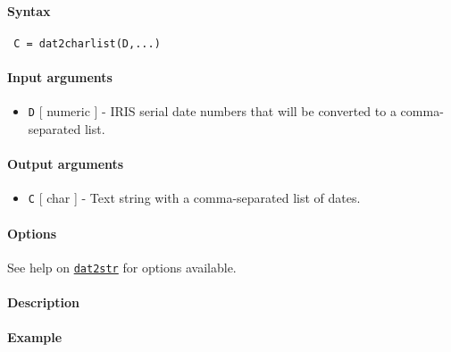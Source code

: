 


	\paragraph{Syntax}
 
 \begin{verbatim}
 C = dat2charlist(D,...)
 \end{verbatim}
 
 \paragraph{Input arguments}
 
 \begin{itemize}
 \item
   \texttt{D} {[} numeric {]} - IRIS serial date numbers that will be
   converted to a comma-separated list.
 \end{itemize}
 
 \paragraph{Output arguments}
 
 \begin{itemize}
 \item
   \texttt{C} {[} char {]} - Text string with a comma-separated list of
   dates.
 \end{itemize}
 
 \paragraph{Options}
 
 See help on \href{dates/dat2str}{\texttt{dat2str}} for options
 available.
 
 \paragraph{Description}
 
 \paragraph{Example}


